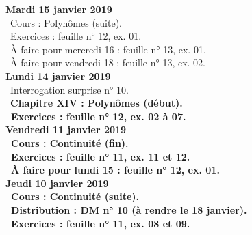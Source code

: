 \documentclass[12pt,a4paper]{article}
\begin{document}
% 
% 
% 

\noindent\textbf{Mardi 15 janvier 2019} \\
\bu\ Cours : Polynômes (suite).\\
\bu\ Exercices : feuille n° 12, ex. 01.\\
\bu\ À faire pour mercredi 16 : feuille n° 13, ex. 01.\\
\bu\ À faire pour vendredi 18 : feuille n° 13, ex. 02.\vspace{.4cm}\\
 
\noindent\textbf{Lundi 14 janvier 2019} \\
\bu\ Interrogation surprise n° 10.\\
\bu\ \bf Chapitre XIV \rm : Polynômes (début).\\
\bu\ Exercices : feuille n° 12, ex. 02 à 07.\vspace{.4cm}\\

\noindent\textbf{Vendredi 11 janvier 2019}\\
\bu\ Cours : Continuité (fin).\\
\bu\ Exercices : feuille n° 11, ex. 11 et 12.\\
\bu\ À faire pour lundi 15 : feuille n° 12, ex. 01.\vspace{.4cm}\\
 
\noindent\textbf{Jeudi 10 janvier 2019}\\
\bu\ Cours : Continuité (suite).\\
\bu\ Distribution : DM n° 10 (à rendre le 18 janvier).\\
\bu\ Exercices : feuille n° 11, ex. 08 et 09.\vspace{.4cm}\\
 
\end{document}
